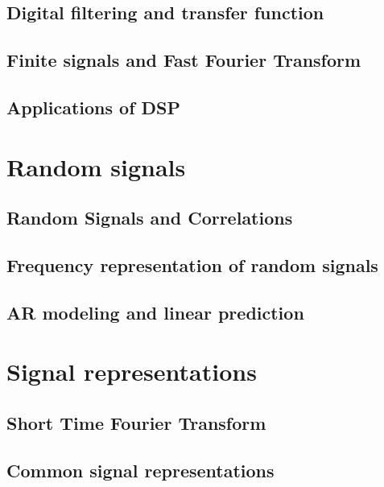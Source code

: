 \documentclass[a4paper, 10pt, dvipsnames]{book}
\begin{document}
\section{Digital filtering and transfer function}
\label{sec:digital_filtering}

\section{Finite signals and Fast Fourier Transform}
\label{sec:finite_signals_fft}

\section{Applications of DSP}
\label{sec:applis_dsp}

\chapter{Random signals}
\label{chap:random}


\section{Random Signals and Correlations}
\label{sec:rand_sig_corr}

\section{Frequency representation of random signals}
\label{sec:freq_resp_random}

\section{AR modeling and linear prediction}
\label{sec:ar_linear}

\chapter{Signal representations}
\label{chap:sig_representations}

\section{Short Time Fourier Transform}
\label{sec:stft}

\section{Common signal representations}
\label{sec:comon_signal_rep}
\end{document}
